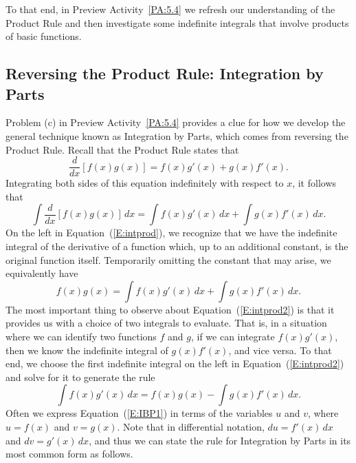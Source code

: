 To that end, in Preview Activity~\ref{PA:5.4} we refresh our understanding of the Product Rule and then investigate some indefinite integrals that involve products of basic functions.



\subsection*{Reversing the Product Rule: Integration by Parts} 

Problem (c) in Preview Activity~\ref{PA:5.4} provides a clue for how we develop the general technique known as Integration by Parts, which comes from reversing the Product Rule.  Recall that the Product Rule states that
$$\frac{d}{dx} \left[ f(x) g(x) \right] = f(x) g'(x) + g(x)  f'(x).$$
Integrating both sides of this equation indefinitely with respect to $x$, it follows that
\begin{equation} \label{E:intprod}
\int \frac{d}{dx} \left[ f(x)  g(x) \right] \, dx = \int f(x) g'(x) \, dx + \int g(x)  f'(x) \, dx.
\end{equation}
On the left in Equation~(\ref{E:intprod}), we recognize that we have the indefinite integral of the derivative of a function which, up to an additional constant, is the original function itself.  Temporarily omitting the constant that may arise, we equivalently have 
\begin{equation} \label{E:intprod2}
f(x)  g(x) = \int f(x) g'(x) \, dx + \int g(x)  f'(x) \, dx.
\end{equation}
The most important thing to observe about Equation~(\ref{E:intprod2}) is that it provides us with a choice of two integrals to evaluate.  That is, in a situation where we can identify two functions $f$ and $g$, if we can integrate $f(x) g'(x)$, then we know the indefinite integral of $g(x) f'(x)$, and vice versa.  To that end, we choose the first indefinite integral on the left in Equation~(\ref{E:intprod2}) and solve for it to generate the rule
\begin{equation} \label{E:IBP1}
\int f(x) g'(x) \, dx  = f(x)  g(x) -  \int g(x)  f'(x) \, dx.
\end{equation}
Often we express Equation~(\ref{E:IBP1}) in terms of the variables $u$ and $v$, where $u = f(x)$ and $v = g(x)$.  Note that in differential notation, $du = f'(x) \, dx$ and $dv = g'(x) \, dx$, and thus we can state the rule for Integration by Parts in its most common form as follows.

